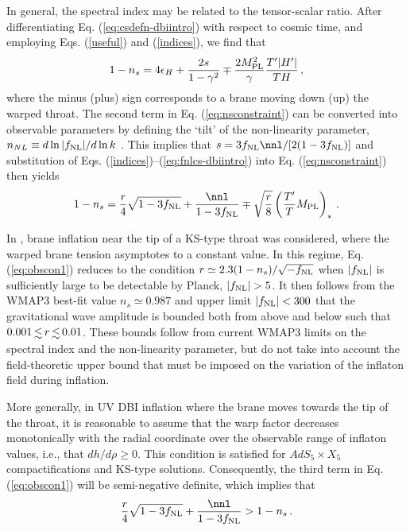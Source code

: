 In general, the spectral index may be related to the tensor-scalar ratio. 
After differentiating Eq. (\ref{eq:csdefn-dbiintro}) 
with respect to cosmic time, and employing Eqs. (\ref{useful}) 
and (\ref{indices}), we find that 
% 
\begin{equation}
\label{eq:nsconstraint}
1-n_s = 4 \epsilon_H +\frac{2s}{1-\gamma^2} \mp 
\frac{2M_{\mathrm{PL}}^2}{\gamma} \frac{T'|H'|}{TH}  \,,
\end{equation}
% 
where the minus (plus) sign corresponds to 
a brane moving down (up) the warped throat. 
The second term in Eq. (\ref{eq:nsconstraint}) 
can be converted into observable parameters
by defining the `tilt' of the non-linearity parameter, 
$n_{NL} \equiv d \ln |f_{\mathrm{NL}}|/d\ln k$ \cite{brane14}. 
This implies that $s=  3 \fnl \nnl /[2(1-3\fnl)]$ and     
substitution of Eqs. (\ref{indices})--(\ref{eq:fnlcs-dbiintro}) 
into Eq. (\ref{eq:nsconstraint}) then yields
% 
\begin{equation}
\label{eq:obscon1}
1-n_s = \frac{r}{4} \sqrt{1-3\fnl} + \frac{\nnl}{1-3\fnl}
\mp \sqrt{\frac{r}{8}} \left( \frac{T'}{T} \Mpl \right)_*  \,.
\end{equation}
% 


In \cite{lidser2}, brane inflation near the tip of a KS-type 
throat was considered, where the warped brane tension asymptotes to a 
constant value. In this regime, Eq. (\ref{eq:obscon1}) reduces to 
the condition $r \simeq 2.3 (1-n_s)/\sqrt{-f_{\mathrm{NL}}}$ when $|f_{\mathrm{NL}}|$ is 
sufficiently large to be detectable by Planck, 
\ie $|f_{\mathrm{NL}}| > 5$. 
It then follows from the  
WMAP3 best-fit value $n_s \simeq 0.987$ and upper limit 
$|f_{\mathrm{NL}}| < 300$ \cite{crim} that the gravitational wave amplitude 
is bounded both from above and below such that $0.001 \, \lsim \, r 
\, \lsim \, 0.01$. These bounds follow from 
current WMAP3 limits on the spectral index and the 
non-linearity parameter, but do not take into account the 
field-theoretic upper bound that must be imposed 
on the variation of the inflaton field during inflation. 


More generally, in UV DBI inflation where the brane moves towards the 
tip of the throat, it is reasonable to assume 
that the warp factor decreases monotonically 
with the radial coordinate over the observable range of inflaton values, 
i.e., that $dh/d \rho \ge 0$. This condition is satisfied for  
$AdS_5 \times X_5$ compactifications and KS-type solutions. 
Consequently, the third term in 
Eq. (\ref{eq:obscon1}) will be semi-negative definite, 
which implies that 
% 
\begin{equation}
\label{eq:halfbound}
\frac{r}{4} \sqrt{1-3\fnl} + \frac{\nnl}{1-3\fnl} 
> 1-n_s \,.
\end{equation}
% 

